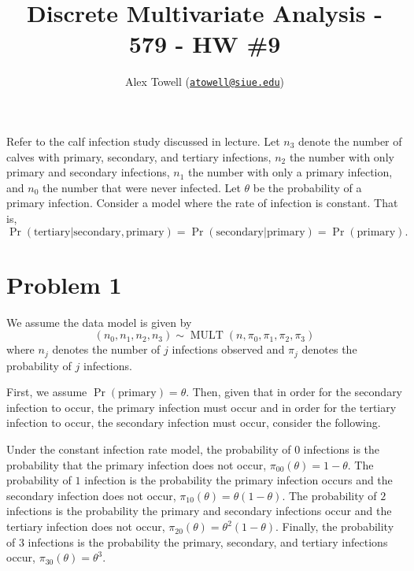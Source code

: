 \documentclass[
]{article}
\title{Discrete Multivariate Analysis - 579 - HW \#9}
\author{Alex Towell
(\href{mailto:atowell@siue.edu}{\nolinkurl{atowell@siue.edu}})}
\date{}
\begin{document}
\maketitle

\newcommand{\var}{\operatorname{Var}}
\newcommand{\expect}{\operatorname{E}}
\newcommand{\corr}{\operatorname{Corr}}
\newcommand{\cov}{\operatorname{Cov}}
\newcommand{\ssr}{\operatorname{SSR}}
\newcommand{\se}{\operatorname{SE}}
\newcommand{\mat}[1]{\mathbf{#1}}
\newcommand{\RR}{\operatorname{RR}}
\newcommand{\eval}[2]{\left. #1 \right\vert_{#2}}

Refer to the calf infection study discussed in lecture. Let \(n_3\)
denote the number of calves with primary, secondary, and tertiary
infections, \(n_2\) the number with only primary and secondary
infections, \(n_1\) the number with only a primary infection, and
\(n_0\) the number that were never infected. Let \(\theta\) be the
probability of a primary infection. Consider a model where the rate of
infection is constant. That is, \[
  \Pr(\text{tertiary} | \text{secondary}, \text{primary}) = \Pr(\text{secondary} | \text{primary}) = \Pr(\text{primary}).
\]

\hypertarget{problem-1}{%
\section{Problem 1}\label{problem-1}}


We assume the data model is given by \[
  (n_0,n_1,n_2,n_3) \sim \operatorname{MULT}(n, \pi_0, \pi_1, \pi_2, \pi_3)
\] where \(n_j\) denotes the number of \(j\) infections observed and
\(\pi_j\) denotes the probability of \(j\) infections.

First, we assume \(\Pr(\text{primary}) = \theta\). Then, given that in
order for the secondary infection to occur, the primary infection must
occur and in order for the tertiary infection to occur, the secondary
infection must occur, consider the following.

Under the constant infection rate model, the probability of \(0\)
infections is the probability that the primary infection does not occur,
\(\pi_{0 0}(\theta) = 1-\theta\). The probability of \(1\) infection is
the probability the primary infection occurs and the secondary infection
does not occur, \(\pi_{1 0}(\theta) = \theta(1-\theta)\). The
probability of \(2\) infections is the probability the primary and
secondary infections occur and the tertiary infection does not occur,
\(\pi_{2 0}(\theta) = \theta^2(1-\theta)\). Finally, the probability of
\(3\) infections is the probability the primary, secondary, and tertiary
infections occur, \(\pi_{3 0}(\theta) = \theta^3\).
\end{document}
